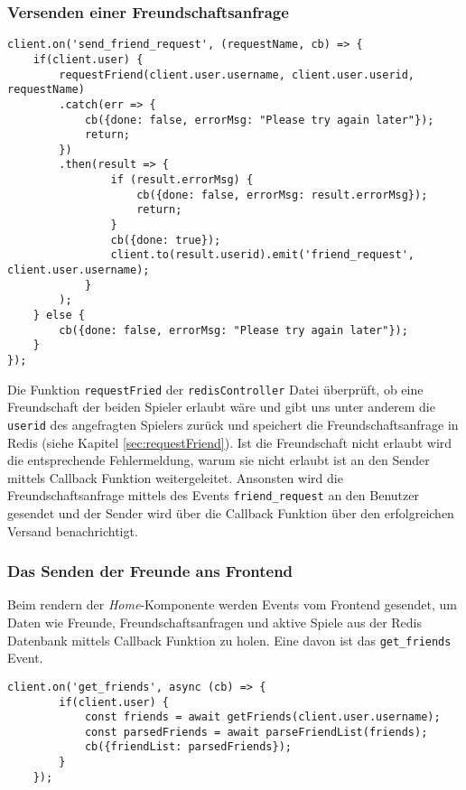 \subsubsection{Versenden einer Freundschaftsanfrage}
\label{sec:Freundschaftsanfrage-backend}
\begin{lstlisting}[style=codeStyle, caption={Der Listener des send\_friend\_request Events}, label={lst:sendFriendRequest}]
client.on('send_friend_request', (requestName, cb) => {
    if(client.user) {
        requestFriend(client.user.username, client.user.userid, requestName)
        .catch(err => {            
            cb({done: false, errorMsg: "Please try again later"});
            return;
        })
        .then(result => {
                if (result.errorMsg) {
                    cb({done: false, errorMsg: result.errorMsg});
                    return;
                }
                cb({done: true});
                client.to(result.userid).emit('friend_request', client.user.username);
            }
        );
    } else {
        cb({done: false, errorMsg: "Please try again later"});
    }
});
\end{lstlisting}

Die Funktion \verb|requestFried| der \verb|redisController| Datei überprüft, ob eine Freundschaft der beiden Spieler erlaubt wäre und gibt uns unter anderem die \verb|userid| des angefragten Spielers zurück und speichert die Freundschaftsanfrage in Redis (siehe Kapitel \ref{sec:requestFriend}). Ist die Freundschaft nicht erlaubt wird die entsprechende Fehlermeldung, warum sie nicht erlaubt ist an den Sender mittels Callback Funktion weitergeleitet. Ansonsten wird die Freundschaftsanfrage mittels des Events \verb|friend_request| an den Benutzer gesendet und der Sender wird über die Callback Funktion über den erfolgreichen Versand benachrichtigt.

\subsubsection{Das Senden der Freunde ans Frontend}
\label{sec:Senden-der-Freunde}
Beim rendern der \textit{Home}-Komponente werden Events vom Frontend gesendet, um Daten wie Freunde, Freundschaftsanfragen und aktive Spiele aus der Redis Datenbank mittels Callback Funktion zu holen. Eine davon ist das \verb|get_friends| Event.

\begin{lstlisting}[style=codeStyle, caption={Der get\_friends Listener}, label={lst:get_friends}]
    client.on('get_friends', async (cb) => {
        if(client.user) {
            const friends = await getFriends(client.user.username);
            const parsedFriends = await parseFriendList(friends);
            cb({friendList: parsedFriends});
        }
    });
\end{lstlisting}

